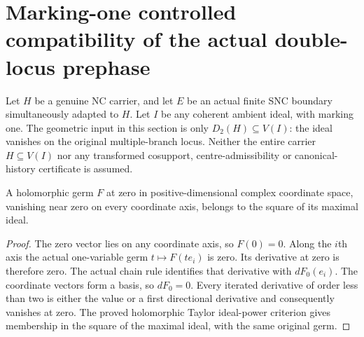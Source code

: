 \section{Marking-one controlled compatibility of the actual double-locus prephase}
\label{sec:hironaka-normal-crossings-double-locus-marked-compatibility}

Let $H$ be a genuine NC carrier, and let $E$ be an actual finite SNC
boundary simultaneously adapted to $H$. Let $I$ be any coherent ambient
ideal, with marking one. The geometric input in this section is only
$D_2(H)\subseteq V(I)$: the ideal vanishes on the original multiple-branch
locus. Neither the entire carrier $H\subseteq V(I)$ nor any transformed
cosupport, centre-admissibility or canonical-history certificate is assumed.

\begin{lemma}
\label{hir:general-nc-double-axes-zero-first-jet}
\leanok
A holomorphic germ $F$ at zero in positive-dimensional complex coordinate
space, vanishing near zero on every coordinate axis, belongs to the square
of its maximal ideal.
\end{lemma}
\begin{proof}
The zero vector lies on any coordinate axis, so $F(0)=0$. Along the $i$th
axis the actual one-variable germ $t\mapsto F(te_i)$ is zero. Its derivative
at zero is therefore zero. The actual chain rule identifies that derivative
with $dF_0(e_i)$. The coordinate vectors form a basis, so $dF_0=0$. Every
iterated derivative of order less than two is either the value or a first
directional derivative and consequently vanishes at zero. The proved
holomorphic Taylor ideal-power criterion gives membership in the square
of the maximal ideal, with the same original germ.
\end{proof}

